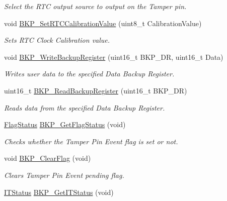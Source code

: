 \begin{DoxyCompactItemize}
\begin{DoxyCompactList}\small\item\em Select the R\+TC output source to output on the Tamper pin. \end{DoxyCompactList}\item 
void \mbox{\hyperlink{group___b_k_p___exported___functions_gad34db08a944450d2e7d56d0fd8db2bca}{B\+K\+P\+\_\+\+Set\+R\+T\+C\+Calibration\+Value}} (uint8\+\_\+t Calibration\+Value)
\begin{DoxyCompactList}\small\item\em Sets R\+TC Clock Calibration value. \end{DoxyCompactList}\item 
void \mbox{\hyperlink{group___b_k_p___exported___functions_ga18d220387db651b3cb71fad5c092e041}{B\+K\+P\+\_\+\+Write\+Backup\+Register}} (uint16\+\_\+t B\+K\+P\+\_\+\+DR, uint16\+\_\+t Data)
\begin{DoxyCompactList}\small\item\em Writes user data to the specified Data Backup Register. \end{DoxyCompactList}\item 
uint16\+\_\+t \mbox{\hyperlink{group___b_k_p___exported___functions_ga359d8fbc945e0f4e34fedbe037d842c8}{B\+K\+P\+\_\+\+Read\+Backup\+Register}} (uint16\+\_\+t B\+K\+P\+\_\+\+DR)
\begin{DoxyCompactList}\small\item\em Reads data from the specified Data Backup Register. \end{DoxyCompactList}\item 
\mbox{\hyperlink{group___exported__types_ga89136caac2e14c55151f527ac02daaff}{Flag\+Status}} \mbox{\hyperlink{group___b_k_p___exported___functions_gacc9aedde760383f0bd146f0d77a547db}{B\+K\+P\+\_\+\+Get\+Flag\+Status}} (void)
\begin{DoxyCompactList}\small\item\em Checks whether the Tamper Pin Event flag is set or not. \end{DoxyCompactList}\item 
void \mbox{\hyperlink{group___b_k_p___exported___functions_ga3f3aea5b0a3d8d5d79b0b506928351ea}{B\+K\+P\+\_\+\+Clear\+Flag}} (void)
\begin{DoxyCompactList}\small\item\em Clears Tamper Pin Event pending flag. \end{DoxyCompactList}\item 
\mbox{\hyperlink{group___exported__types_gaacbd7ed539db0aacd973a0f6eca34074}{I\+T\+Status}} \mbox{\hyperlink{group___b_k_p___exported___functions_ga99566c9f1f17f499020606cb63511494}{B\+K\+P\+\_\+\+Get\+I\+T\+Status}} (void)

\end{DoxyCompactItemize}
